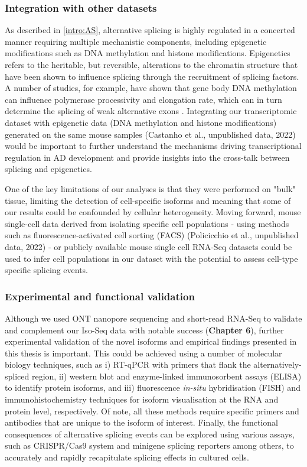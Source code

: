 {\subsubsection{Integration with other datasets} 
As described in \cref{intro:AS}, alternative splicing is highly regulated in a concerted manner requiring multiple mechanistic components, including epigenetic modifications such as DNA methylation and histone modifications. Epigenetics refers to the heritable, but reversible, alterations to the chromatin structure that have been shown to influence splicing through the recruitment of splicing factors\cite{Yang2014, Shukla2011, Zhang2020a, Shukla2011, Luco2011}. A number of studies, for example, have shown that gene body DNA methylation can influence polymerase processivity and elongation rate, which can in turn determine the splicing of weak alternative exons \cite{Yang2014, Shukla2011}. Integrating our transcriptomic dataset with epigenetic data (DNA methylation and histone modifications) generated on the same mouse samples (Castanho et al., unpublished data, 2022) would be important to further understand the mechanisms driving transcriptional regulation in AD development and provide insights into the cross-talk between splicing and epigenetics. 

One of the key limitations of our analyses is that they were performed on "bulk" tissue, limiting the detection of cell-specific isoforms and meaning that some of our results could be confounded by cellular heterogeneity. Moving forward, mouse single-cell data derived from isolating specific cell populations - using methods such as fluorescence-activated cell sorting (FACS) (Policicchio  et al., unpublished data, 2022) - or publicly available mouse single cell RNA-Seq datasets could be used to infer cell populations in our dataset with the potential to assess cell-type specific splicing events.   

\subsubsection{Experimental and functional validation}
Although we used ONT nanopore sequencing and short-read RNA-Seq to validate and complement our Iso-Seq data with notable success (\textbf{Chapter 6}), further experimental validation of the novel isoforms and empirical findings presented in this thesis is important. This could be achieved using a number of molecular biology techniques, such as i) RT-qPCR with primers that flank the alternatively-spliced region, ii) western blot and enzyme-linked immunosorbent assays (ELISA) to identify protein isoforms, and iii) fluorescence \textit{in-situ} hybridisation (FISH) and immunohistochemistry techniques for isoform visualisation at the RNA and protein level, respectively. Of note, all these methods require specific primers and antibodies that are unique to the isoform of interest. Finally, the functional consequences of alternative splicing events can be explored using various assays, such as CRISPR/Cas9 system and minigene splicing reporters among others, to accurately and rapidly recapitulate splicing effects in cultured cells.  


}
